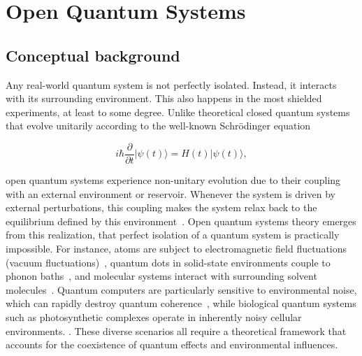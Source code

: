 \chapter{Open Quantum Systems} %
\label{chapter_open_quantum_systems} %


\section{Conceptual background}
\label{sec:conceptual_background}

Any real-world quantum system is not perfectly isolated. Instead, it interacts with its surrounding environment. This also happens in the most shielded experiments, at least to some degree. Unlike theoretical closed quantum systems that evolve unitarily according to the well-known Schrödinger equation 

\begin{equation}
	i\hbar \frac{\partial}{\partial t} |\psi(t)\rangle = H(t) |\psi(t)\rangle ,
	\label{eq:SchrödingerEquation}
\end{equation}

\noindent
open quantum systems experience non-unitary evolution due to their coupling with an external environment or reservoir.
Whenever the system is driven by external perturbations, this coupling makes the system relax back to the equilibrium defined by this environment~\cite{breuerpetruccione2009theoryopenquantum, weiss2012quantumdissipativesystems}.
Open quantum systems theory emerges from this realization, that perfect isolation of a quantum system is practically impossible. For instance, atoms are subject to electromagnetic field fluctuations (vacuum fluctuations)~\cite{breuerpetruccione2009theoryopenquantum}, quantum dots in solid-state environments couple to phonon baths~\cite{weiss2012quantumdissipativesystems}, and molecular systems interact with surrounding solvent molecules~\cite{mukamel1995principlesnonlinearoptical}. Quantum computers are particularly sensitive to environmental noise, which can rapidly destroy quantum coherence~\cite{laddetal2010quantumcomputers}, while biological quantum systems such as photosynthetic complexes operate in inherently noisy cellular environments. . 
These diverse scenarios all require a theoretical framework that accounts for the coexistence of quantum effects and environmental influences.


